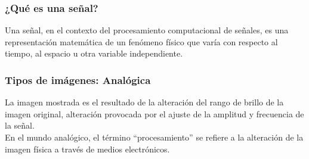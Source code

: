 \documentclass[
10pt, %
aspectratio=169, %
]{beamer}
\begin{document}
	\begin{frame}
		
		\frametitle{¿Qué es una señal?}
		
		\begin{alertblock}{}
			Una señal, en el contexto del procesamiento computacional de señales, es una representación matemática de un fenómeno físico que varía con respecto al tiempo, al espacio u otra variable independiente. 
		\end{alertblock}
		
	\end{frame}
	
	\begin{frame}
		
		\frametitle{Tipos de imágenes: Analógica}
		
		\noindent\begin{minipage}{.5\textwidth}
			La imagen mostrada es el resultado de la alteración del rango de brillo de la imagen original, alteración provocada por el ajuste de la amplitud y frecuencia de la señal.\\[2mm]
			
			En el mundo analógico, el término ``procesamiento'' se refiere a la alteración de la imagen física a través de medios electrónicos.
			

\end{minipage}
\end{frame}
\end{document}
